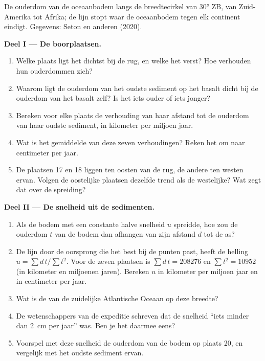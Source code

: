 \begin{problem}
\begin{center}
{\small De ouderdom van de oceaanbodem langs de breedtecirkel van \ang{30} ZB, van
Zuid-Amerika tot Afrika; de lijn stopt waar de oceaanbodem tegen elk continent
eindigt. Gegevens: Seton en anderen (2020).}
\end{center}

\medskip
\noindent\textbf{Deel I --- De boorplaatsen.}
\begin{enumerate}
  \item Welke plaats ligt het dichtst bij de rug, en welke het verst? Hoe
        verhouden hun ouderdommen zich?
  \item Waarom ligt de ouderdom van het oudste sediment op het basalt dicht bij
        de ouderdom van het basalt zelf? Is het iets ouder of iets
        jonger?
  \item Bereken voor elke plaats de verhouding van haar afstand tot de ouderdom
        van haar oudste sediment, in kilometer per miljoen jaar.
  \item Wat is het gemiddelde van deze zeven verhoudingen? Reken het om naar
        centimeter per jaar.
  \item De plaatsen 17 en 18 liggen ten oosten van de rug, de andere ten westen
        ervan. Volgen de oostelijke plaatsen dezelfde trend als de westelijke? Wat
        zegt dat over de spreiding?
\end{enumerate}

\medskip
\noindent\textbf{Deel II --- De snelheid uit de sedimenten.}
\begin{enumerate}[resume]
  \item Als de bodem met een constante halve snelheid $u$ spreidde, hoe zou de
        ouderdom $t$ van de bodem dan afhangen van zijn afstand $d$ tot de as?
  \item De lijn door de oorsprong die het best bij de punten past, heeft de
        helling $u = \sum d\,t / \sum t^2$. Voor de zeven plaatsen is
        $\sum d\,t = \num{208276}$ en $\sum t^2 = \num{10952}$ (in
        kilometer en miljoenen jaren). Bereken $u$ in kilometer per
        miljoen jaar en in centimeter per jaar.
  \item Wat is de  van de zuidelijke Atlantische
        Oceaan op deze breedte?
  \item De wetenschappers van de expeditie schreven dat de snelheid ``iets
        minder dan \qty{2}{cm} per jaar'' was. Ben je het daarmee eens?
  \item Voorspel met deze snelheid de ouderdom van de bodem op plaats 20, en
        vergelijk met het oudste sediment ervan.
\end{enumerate}


\end{problem}
